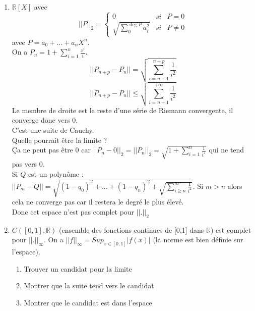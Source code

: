 \documentclass[a4paper, oneside]{report}
\newcommand{\R}{\mathbb{R}}
\begin{document}
\begin{enumerate}
\item $\R[X]$ avec 
$$||P||_2 = \left\{\begin{array}{lll}
0 &si& P=0\\
\sqrt{\sum_{0}^{\deg P}a_i^2} &si& P\neq 0
\end{array}\right.$$
avec $P=a_0+...+a_nX^n$.\\
On a $P_n=1+\sum_{i=1}^n\frac{x^i}{i}$.\\
$$||P_{n+p}-P_n|| = \sqrt{\sum_{i=n+1}^{n+p}\frac{1}{i^2}}$$
$$||P_{n+p}-P_n|| \leq \sqrt{\sum_{i=n+1}^{+\infty}\frac{1}{i^2}}$$
Le membre de droite est le reste d'une série de Riemann convergente, il converge donc vers 0.\\
C'est une suite de Cauchy.\\
Quelle pourrait être la limite ?\\
Ça ne peut pas être 0 car $||P_n-0||_2=||P_n||_2=\sqrt{1+\sum_{i=1}^{n}\frac{1}{i^2}}$ qui ne tend pas vers 0.\\
Si $Q$ est un polynôme : $||P_m-Q|| = \sqrt{(1-q_0)^2+...+(1-q_n)^2+\sqrt{\sum_{i\geq n}^{m}\frac{1}{i^2}} }$. Si $m>n$ alors cela ne converge pas car il restera le degré le plus élevé.\\
Donc cet espace n'est pas complet pour $||.||_2$

\item $C([0,1],\R)$ (ensemble des fonctions continues de [0,1] dans $\R$) est complet pour $||.||_\infty$. On a $||f||_\infty = Sup_{x\in [0,1]}|f(x)|$ (la norme est bien définie sur l'espace).\\
\begin{enumerate}
\item Trouver un candidat pour la limite
\item Montrer que la suite tend vers le candidat
\item Montrer que le candidat est dans l'espace
\end{enumerate}


\end{enumerate}
\end{document}
